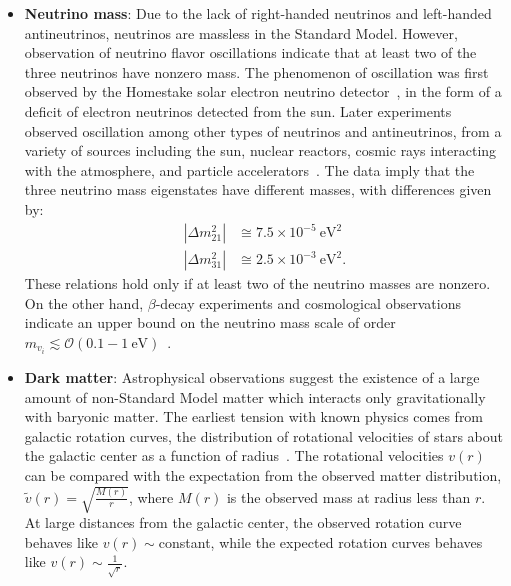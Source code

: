 \begin{itemize}
	\item \textbf{Neutrino mass}: Due to the lack of right-handed neutrinos and left-handed antineutrinos, neutrinos are massless in the Standard Model. However, observation of neutrino flavor oscillations indicate that at least two of the three neutrinos have nonzero mass. The phenomenon of oscillation was first observed by the Homestake solar electron neutrino detector~\cite{Cleveland:1998nv}, in the form of a deficit of electron neutrinos detected from the sun. Later experiments observed oscillation among other types of neutrinos and antineutrinos, from a variety of sources including the sun, nuclear reactors, cosmic rays interacting with the atmosphere, and particle accelerators~\cite{pdg}. The data imply that the three neutrino mass eigenstates have different masses, with differences given by:
	\begin{align}\label{eqn:neutrino-mass-differences}
		|\Delta m_{21}^2| &\cong 7.5\times 10^{-5}~\mbox{eV}^2 \\
		|\Delta m_{31}^2| &\cong 2.5\times 10^{-3}~\mbox{eV}^2.
	\end{align}
	These relations hold only if at least two of the neutrino masses are nonzero. On the other hand, $\beta$-decay experiments and cosmological observations indicate an upper bound on the neutrino mass scale of order $m_{v_i} \lesssim \mathcal{O}(0.1-\SI{1}{\electronvolt})$~\cite{Aseev:2011ia, Abazajian:2011ck, Ade:2013zuv}.

	\item \textbf{Dark matter}: Astrophysical observations suggest the existence of a large amount of non-Standard Model matter which interacts only gravitationally with baryonic matter. The earliest tension with known physics comes from galactic rotation curves, the distribution of rotational velocities of stars about the galactic center as a function of radius~\cite{1980ApJ_238_471R}. The rotational velocities $v(r)$ can be compared with the expectation from the observed matter distribution, $\tilde{v}(r)=\sqrt{\frac{M(r)}{r}}$, where $M(r)$ is the observed mass at radius less than $r$. At large distances from the galactic center, the observed rotation curve behaves like $v(r)\sim$constant, while the expected rotation curves behaves like $v(r)\sim \frac{1}{\sqrt{r}}$. 


\end{itemize}
